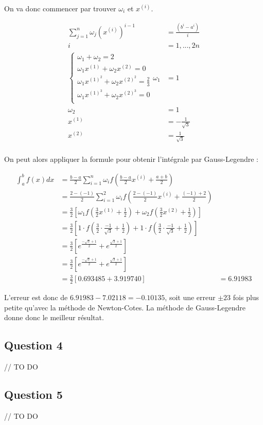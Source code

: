 On va donc commencer par trouver $\omega_i$ et $x^{(i)}$.

\begin{equation}
	\begin{aligned}
		\sum_{j=1}^n \omega_j (x^{(i)})^{i-1} &= \frac{(b^i-a^i)}{i}\\
		i &= 1, ..., 2n\\
		\begin{cases}
		\omega_1+\omega_2 = 2\\
		\omega_1x^{(1)}+\omega_2 x^{(2)}= 0\\
		\omega_1x^{(1	)^2}+\omega_2 x^{(2)^2}= \frac{2}{3}\\
		\omega_1x^{(1)^3}+\omega_2 x^{(2)^3}= 0\\
		\end{cases}
		\omega_1 &= 1\\
		\omega_2 &= 1\\
		x^{(1)} &= -\frac{1}{\sqrt{3}}\\
		x^{(2)} &= \frac{1}{\sqrt{3}}\\
	\end{aligned}
\end{equation}

On peut alors appliquer la formule pour obtenir l'intégrale par Gauss-Legendre :

\begin{equation}
	\begin{aligned}
		\int_a^b f(x) dx &= \frac{b-a}{2} \sum_{i=1}^n \omega_i f\left(\frac{b-a}{2}x^{(i)}+\frac{a+b}{2}\right)\\
		&= \frac{2-(-1)}{2} \sum_{i=1}^2 \omega_i f\left(\frac{2-(-1)}{2}x^{(i)}+\frac{(-1)+2}{2}\right)\\
		&= \frac{3}{2} \left [\omega_1 f\left(\frac{3}{2}x^{(1)}+\frac{1}{2}\right) + \omega_2 f\left(\frac{3}{2}x^{(2)}+\frac{1}{2}\right)\right ]\\
		&= \frac{3}{2} \left [1 \cdot f\left(\frac{3}{2}\cdot\frac{-1}{\sqrt{3}}+\frac{1}{2}\right) + 1 \cdot f\left(\frac{3}{2}\cdot\frac{-1}{\sqrt{3}}+\frac{1}{2}\right)\right ]\\
		&= \frac{3}{2} \left [e^{\frac{-\sqrt{3}+1}{2}}+ e^{\frac{\sqrt{3}+1}{2}}\right ]\\
		&= \frac{3}{2} \left [e^{\frac{-\sqrt{3}+1}{2}}+ e^{\frac{\sqrt{3}+1}{2}}\right ]\\
		&= \frac{3}{2} \left[0.693485+3.919740\right]
		&=  6.91983
	\end{aligned}
\end{equation}

L'erreur est donc de $6.91983 -  7.02118 = -0.10135$, soit une erreur $\pm 23$ fois plus petite qu'avec la méthode de Newton-Cotes. La méthode de Gauss-Legendre donne donc le meilleur résultat.

\subsection{Question 4}

// TO DO


\subsection{Question 5}

// TO DO